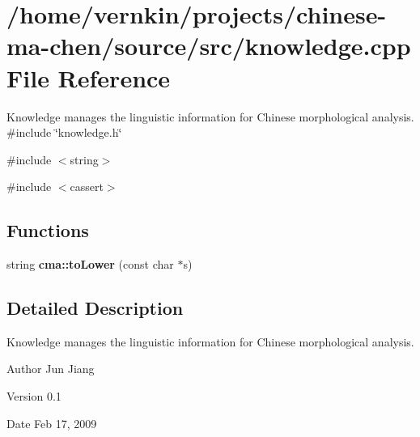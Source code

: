 \section{/home/vernkin/projects/chinese-\/ma-\/chen/source/src/knowledge.cpp File Reference}
\label{knowledge_8cpp}


Knowledge manages the linguistic information for Chinese morphological analysis.  
{\ttfamily \#include \char`\"{}knowledge.h\char`\"{}}\par
{\ttfamily \#include $<$string$>$}\par
{\ttfamily \#include $<$cassert$>$}\par
\subsection*{Functions}
\begin{DoxyCompactItemize}
\item 
string {\bf cma::toLower} (const char $\ast$s)
\end{DoxyCompactItemize}


\subsection{Detailed Description}
Knowledge manages the linguistic information for Chinese morphological analysis. \begin{DoxyAuthor}{Author}
Jun Jiang 
\end{DoxyAuthor}
\begin{DoxyVersion}{Version}
0.1 
\end{DoxyVersion}
\begin{DoxyDate}{Date}
Feb 17, 2009 
\end{DoxyDate}
